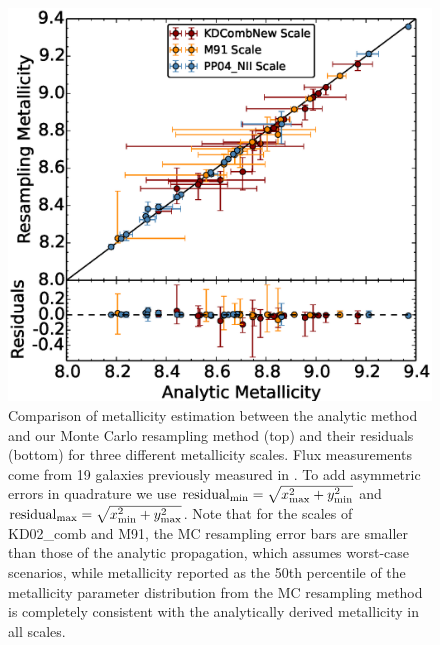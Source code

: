 \documentclass{emulateapj}
\begin{document}
\begin{figure}[ht!]
  \includegraphics[width=1.0\columnwidth]{abcomparison6.eps}
   \caption{Comparison of metallicity estimation between the analytic method and our Monte Carlo resampling method (top) and their residuals (bottom) for three different metallicity scales. Flux measurements come from 19 galaxies previously measured in \citet{modjaz11}. To add asymmetric errors in quadrature we use $\mathrm{residual}_{\rm min}=\sqrt {x_{\rm max}^2 + y_{\rm min}^2}$ and $\mathrm{residual}_{\rm max}=\sqrt {x_{\rm min}^2 + y_{\rm max}^2}$. Note that for the scales of KD02\_comb and M91,  the MC resampling error bars are smaller than those of the analytic propagation, which assumes worst-case scenarios, while metallicity reported as the 50th percentile of the metallicity parameter distribution from the MC resampling method is completely consistent with the analytically derived metallicity in all scales.}
 \label{comp_anal_MC}
\end{figure}




\end{document}
